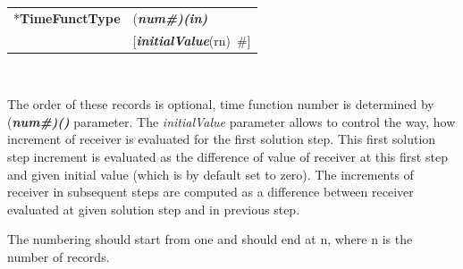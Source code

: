 \documentclass[a4paper]{article}
\makeatletter
\newcommand{\param}[1]{{\em #1}}
\newcommand{\fieldVal}[2]{\mbox{({\it\bf{#1}\#)\tiny (#2)}}}
\newcommand{\keywordnotype}[1]{\mbox{{\it{\bf{#1}}}}}
\newcommand{\keyword}[2]{\mbox{{\keywordnotype{#1}\tiny (#2)}}}
\newcommand{\entKeyword}[1]{\mbox{{*{\bf{#1}}}}}
\newcommand{\field}[2]{\mbox{\keyword{#1}{#2}~\#}}
\newcommand{\optField}[2]{\mbox{[\field{#1}{#2}]}}
\newenvironment{record}[1][]{\begin{tabular}{|ll}}{\end{tabular}\\}
\newcommand{\recentry}[2]{{#1}&{#2}\\}
\newcounter{rcc}
\newenvironment{record}[1][\textwidth]{\setcounter{rcc}{0}\begin{tabular*}{#1}{|ll@{\extracolsep{\fill}}r}}{\end{tabular*}\\}
\newcommand{\recentry}[2]{\ifthenelse{\value{rcc}>0}{&$\backslash$ \\}{\setcounter{rcc}{1}}{#1}&{#2}}
\makeatother
\begin{document}
\noindent
\begin{record}
  \recentry{\entKeyword{TimeFunctType}}{\fieldVal{num}{in}}
  \recentry{}{\optField{initialValue}{rn}}
\end{record}

The order of these records is optional, time function number is determined by \fieldVal{num}{} parameter. The \param{initialValue} parameter allows to control the way, how increment of receiver is evaluated for the first solution step.
This first solution step increment is evaluated as the difference of value of receiver at this first step and given initial value (which is by default set to zero). The increments of receiver in subsequent steps are computed as a difference between receiver evaluated at given solution step and in previous step.

The numbering should start from one and should end at n, where n is the number of records.
\end{document}
